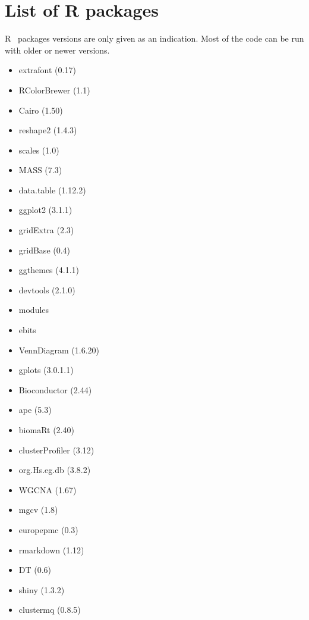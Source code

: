 \chapter{List of R packages}\label{sec:Rpackages}

\textsf{R}~ packages versions are only given as an indication.
Most of the code can be run with older or newer versions.

\begin{multicols}{2}
    \hspace{-1cm}\begin{itemize}
    \item extrafont (0.17)~
    \item RColorBrewer (1.1)~
    \item Cairo (1.50)~
    \item reshape2 (1.4.3)~
    \item scales (1.0)~
    \item MASS (7.3)~
    \item data.table (1.12.2)~
    \item ggplot2 (3.1.1)~
    \item gridExtra (2.3)~
    \item gridBase (0.4)~
    \item ggthemes (4.1.1)~

    \item devtools (2.1.0)~
    \item modules~
    \item ebits~
    \item VennDiagram (1.6.20)~
    \item gplots (3.0.1.1)~
    \item Bioconductor (2.44)~
    \item ape (5.3)~
    \item biomaRt (2.40)~
    \item clusterProfiler (3.12)~
    \item org.Hs.eg.db (3.8.2)~

    \item WGCNA (1.67)~
    \item mgcv (1.8)~
    \item europepmc (0.3)~
    \item rmarkdown (1.12)~
    \item DT (0.6)~
    \item shiny (1.3.2)~
    \item clustermq (0.8.5)~
\end{itemize}
\end{multicols}




